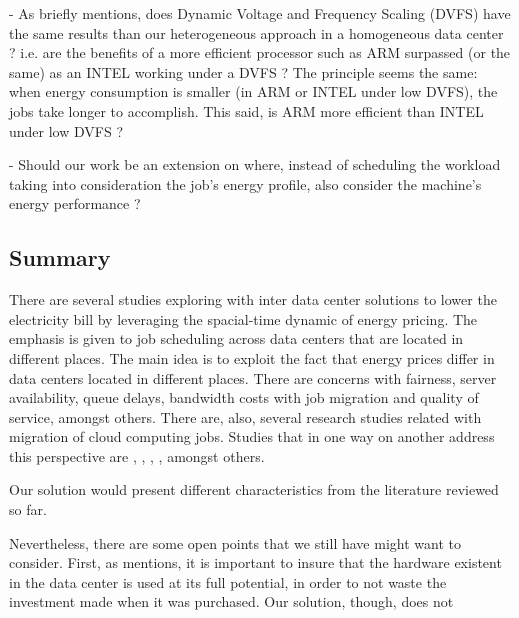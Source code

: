 - As \cite{DYN_PRICING_HPC} briefly mentions, does  Dynamic Voltage and Frequency 
  Scaling (DVFS) have the same results than our heterogeneous approach in a
  homogeneous data center ? i.e. are the benefits of a more efficient processor
  such as ARM surpassed (or the same) as an INTEL working under a DVFS ? The
  principle seems the same: when energy consumption is smaller (in ARM or INTEL
  under low DVFS), the jobs take longer to accomplish. This said, is ARM more
  efficient than INTEL under low DVFS ?   

- Should our work be an extension on \cite{DYN_PRICING_HPC} where, instead of
  scheduling the workload taking into consideration the job's energy profile,
  also consider the machine's energy performance ?



\subsection{Summary}


\begin{comment}
  Add references to the summary  
\end{comment}


There are several studies exploring with inter data center solutions to lower
the electricity bill by leveraging the spacial-time dynamic of energy pricing. The 
emphasis is given to job scheduling across data centers that are located in 
different places. The main idea is to exploit the fact that energy prices 
differ in data centers located in different places. There are concerns with 
fairness, server availability, queue delays, bandwidth costs with job migration
and quality of service, amongst others. There are, also, several 
research studies related with migration of cloud computing jobs. Studies that in
one way on another address this perspective are \cite{EFF_JOB_SCHEDULING},
\cite{MIGRATION_CLOUD}, \cite{MINIMIZING_DIST}, \cite{CUTTING_BILL}, amongst others. 


Our solution would present different characteristics from the literature
reviewed so far.

Nevertheless, there are some open points that we still have might want to
consider. First, as \cite{DYN_PRICING_HPC} mentions, it is important to insure
that the hardware existent in the data center is used at its full potential, in
order to not waste the investment made when it was purchased. Our solution,
though, does not 
